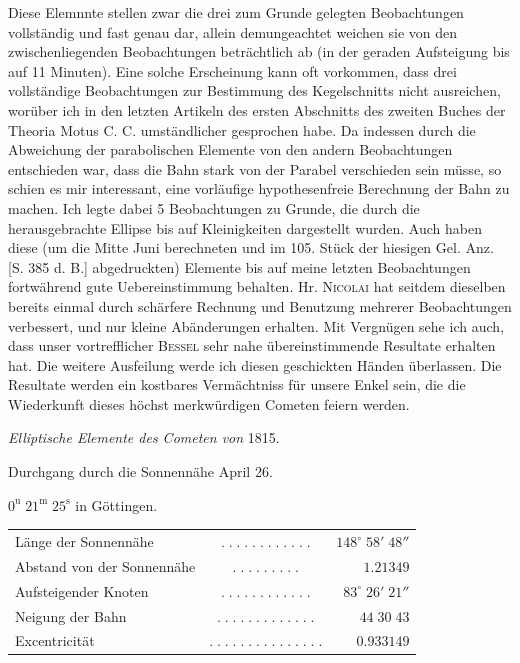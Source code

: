 \par\indent Diese Elemnnte 
stellen zwar die drei zum Grunde gelegten Beobachtungen vollständig und fast genau
dar, allein demungeachtet weichen sie von den zwischenliegenden Beobachtungen beträchtlich ab (in
der geraden Aufsteigung bis auf 11 Minuten). Eine solche Erscheinung kann oft vorkommen, dass
drei vollständige Beobachtungen zur Bestimmung des Kegelschnitts nicht ausreichen, worüber ich in
den letzten Artikeln des ersten Abschnitts des zweiten Buches der Theoria Motus C. C.
umständlicher gesprochen habe. Da indessen durch die Abweichung der parabolischen Elemente von den
andern Beobachtungen entschieden war, dass die Bahn stark von der Parabel verschieden sein müsse,
so schien es mir interessant, eine vorläufige hypothesenfreie Berechnung der Bahn zu machen. Ich
legte dabei 5 Beobachtungen zu Grunde, die durch die herausgebrachte Ellipse bis auf Kleinigkeiten
dargestellt wurden. Auch haben diese (um die Mitte Juni berechneten und im 105. Stück der
hiesigen Gel. Anz. [S. 385 d. B.] abgedruckten) Elemente bis auf meine letzten Beobachtungen
fortwährend gute Uebereinstimmung
behalten. Hr. \textsc{Nicolai} hat seitdem dieselben bereits einmal durch schärfere Rechnung und Benutzung
mehrerer Beobachtungen verbessert, und nur kleine Abänderungen erhalten. Mit Vergnügen sehe ich
auch, dass unser vortrefflicher \textsc{Bessel} sehr nahe übereinstimmende Resultate erhalten hat. Die weitere
Ausfeilung werde ich diesen geschickten Händen überlassen. Die Resultate werden ein kostbares Vermächtniss für unsere Enkel sein, die die Wiederkunft dieses höchst merkwürdigen Cometen feiern werden.

\begin{center}
\emph{Elliptische Elemente des Cometen von} 1815.
\end{center}

\begin{center}\fontsize{10}{12}\selectfont Durchgang durch die Sonnennähe April 26.\par $0^{\mathrm u}\;21^{\mathrm m}\;25^{\mathrm s}$ in Göttingen.\end{center}
\begin{center}\fontsize{9}{11}\selectfont\setlength{\tabcolsep}{2pt}\renewcommand{\arraystretch}{1.15}\begin{tabular}{lcr}
Länge der Sonnennähe & $.\;.\;.\;.\;.\;.\;.\;.\;.\;.\;.\;.$ & $148^\circ\;58'\;48''$\\
Abstand von der Sonnennähe & $.\;.\;.\;.\;.\;.\;.\;.\;.$ & $1.21349$\\
Aufsteigender Knoten & $.\;.\;.\;.\;.\;.\;.\;.\;.\;.\;.\;.$ & $83^\circ\;26'\;21''$\\
Neigung der Bahn & $.\;.\;.\;.\;.\;.\;.\;.\;.\;.\;.\;.\;.$ & $44\;30\;43$\\
Excentricität & $.\;.\;.\;.\;.\;.\;.\;.\;.\;.\;.\;.\;.\;.\;.$ & $0.933149$\\
\end{tabular}\end{center}

